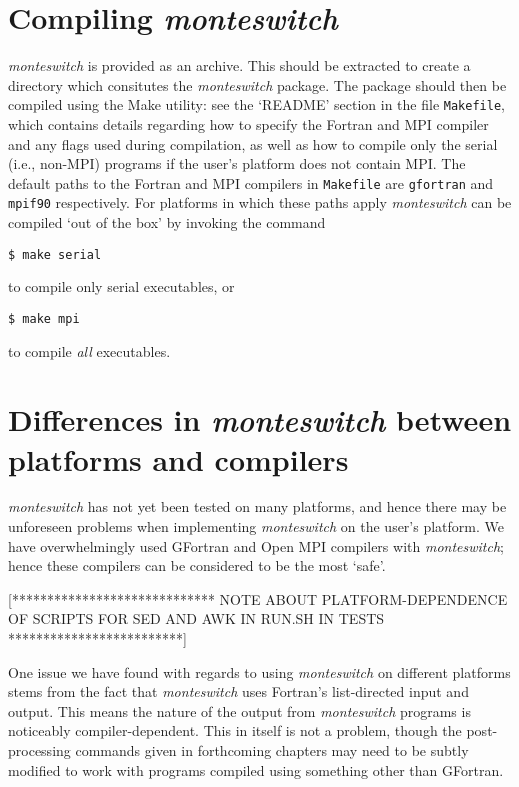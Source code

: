 \documentclass{report}
\begin{document}
\section{Compiling \emph{monteswitch}}
\emph{monteswitch} is provided as an archive. This should be extracted to create a directory which consitutes the \emph{monteswitch} package. The 
package should then be compiled using the Make utility: see the `README' section in the file \texttt{Makefile}, which contains details regarding how to
specify the Fortran and MPI compiler and any flags used during compilation, as well as how to compile only the serial (i.e., non-MPI) programs
if the user's platform does not contain MPI.
The default paths to the Fortran and MPI compilers in \texttt{Makefile} are \texttt{gfortran} and \texttt{mpif90} respectively. For platforms in which
these paths apply \emph{monteswitch} can be compiled `out of the box' by invoking the command 
\begin{verbatim}
$ make serial
\end{verbatim} 
to compile only serial executables, or 
\begin{verbatim}
$ make mpi
\end{verbatim}
to compile \emph{all} executables.


\section{Differences in \emph{monteswitch} between platforms and compilers}
\emph{monteswitch} has not yet been tested on many platforms, and hence there may be unforeseen problems when implementing \emph{monteswitch} on
the user's platform. We have overwhelmingly used GFortran and Open MPI compilers with \emph{monteswitch}; hence these compilers can be considered 
to be the most `safe'.

[***************************** NOTE ABOUT PLATFORM-DEPENDENCE OF SCRIPTS FOR SED AND AWK IN RUN.SH IN TESTS *************************]

One issue we have found with regards to using \emph{monteswitch} on different platforms stems from the fact that \emph{monteswitch} uses Fortran's 
list-directed input and output. This means the nature of the output from \emph{monteswitch} programs is noticeably compiler-dependent. This in itself
is not a problem, though the post-processing commands given in forthcoming chapters may need to be subtly modified to work with programs compiled using 
something other than GFortran.
\end{document}
